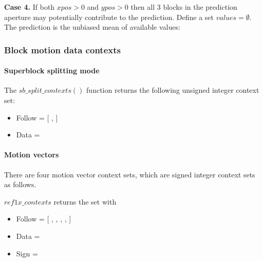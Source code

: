 {\bf Case 4.} If both $xpos>0$ and $ypos>0$ then all 3 blocks in the prediction aperture may potentially
contribute to the prediction. Define a set $values=\emptyset$. The prediction is the 
unbiased mean of available values:

\begin{pseudo*}
\bsIF{\BlockData[ypos][xpos-1][mode]==\Intra}
\bsEND
\bsIF{\BlockData[ypos-1][xpos][mode]==\Intra}
\bsEND
\bsIF{\BlockData[ypos-1][xpos-1][mode]==\Intra}
\bsEND

\bsELSE
\bsEND
\end{pseudo*}


\subsubsection{Block motion data contexts}

\paragraph{Superblock splitting mode\\}

The $sb\_split\_contexts()$ function returns the following unsigned integer context set:

\begin{itemize}
\item Follow = [ \SBSplitFollowOne, \SBSplitFollowTwo ]
\item Data = \SBSplitData
\end{itemize}

\paragraph{Motion vectors\\}
\label{mvcontexts}

There are four motion vector context sets, which are signed integer context sets as follows.

$ref1x\_contexts$ returns the set with
\begin{itemize}
\item Follow = [ \RefOnexFollowOne, \RefOnexFollowTwo, \RefOnexFollowThree, \RefOnexFollowFour, \RefOnexFollowFivePlus ]
\item Data = \RefOnexData
\item Sign = \RefOnexSign
\end{itemize}

